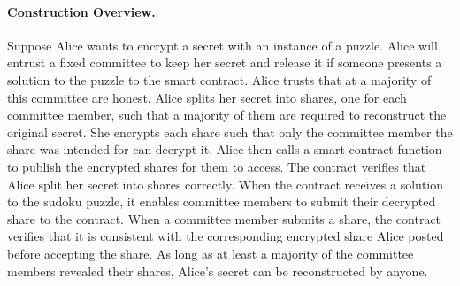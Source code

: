 \paragraph{Construction Overview.}
Suppose Alice wants to encrypt a secret with an instance of a puzzle.
Alice will entrust a fixed committee to keep her secret and release it if someone presents a solution to the puzzle to the smart contract.
Alice trusts that at a majority of this committee are honest.
Alice splits her secret into shares, one for each committee member, such that a majority of them are required to reconstruct the original secret.
She encrypts each share such that only the committee member the share was intended for can decrypt it.
Alice then calls a smart contract function to publish the encrypted shares for them to access.
The contract verifies that Alice split her secret into shares correctly.
When the contract receives a solution to the sudoku puzzle, it enables committee members to submit their decrypted share to the contract.
When a committee member submits a share, the contract verifies that it is consistent with the corresponding encrypted share Alice posted before accepting the share.
As long as at least a majority of the committee members revealed their shares, Alice's secret can be reconstructed by anyone.